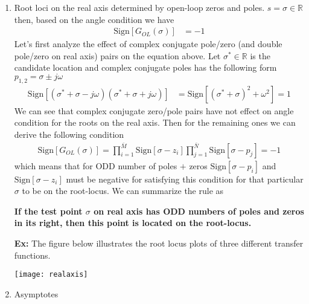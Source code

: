 \documentclass[twoside]{article}
\begin{document}
\begin{enumerate}
\item Root loci on the real axis determined by open-loop zeros and
  poles. $s = \sigma \in \mathbb{R}$ then, based on the angle condition
  we have
%
\begin{align*}
\mathrm{Sign} [ G_{OL}(\sigma) ] &= -1
\end{align*}
%
Let's first analyze the effect of complex conjugate pole/zero (and double pole/zero on real axis)
pairs on the equation above. Let $\sigma^* \in \mathbb{R}$  is the candidate location and complex
conjugate poles has the following form $p_{1,2} = \sigma \pm j \omega$
\begin{align*}
\mathrm{Sign} [ ( \sigma^* + \sigma - j \omega) (\sigma^* + \sigma + j \omega) ] &= \mathrm{Sign} [ (\sigma^* + \sigma)^2 + \omega^2 ] 
= 1 
\end{align*}
%
We can see that complex conjugate zero/pole pairs have not effect 
on angle condition for the roots on the real axis. Then for
the remaining ones we can derive the following condition
%
\begin{align*}
\mathrm{Sign} [ G_{OL}(\sigma) ] = \prod_{i=1}^{\bar{M}}  \mathrm{Sign} [\sigma - z_i]
  \prod_{j=1}^{\bar{N}}  \mathrm{Sign} [\sigma - p_j] = -1
\end{align*}
%
which means that for ODD number of poles $+$  zeros 
$\mathrm{Sign} [\sigma - p_i ]$ and $\mathrm{Sign} [\sigma - z_i] $ 
must be negative for satisfying this condition for that particular $\sigma$
to be on the root-locus. We can summarize the rule as

\textbf{If the test point $\sigma$ on real axis has ODD numbers of 
poles and zeros in its right, then this point is located 
on the root-locus.}

\newpage

\textbf{Ex:} The figure below illustrates the root locus plots
of three different transfer functions.

\begin{center}
\begin{minipage}[h]{0.99\linewidth}
    \begin{center}
      \texttt{[image: realaxis]}
    \end{center}
\end{minipage}
\end{center}

\item Asymptotes


\end{enumerate}
\end{document}
